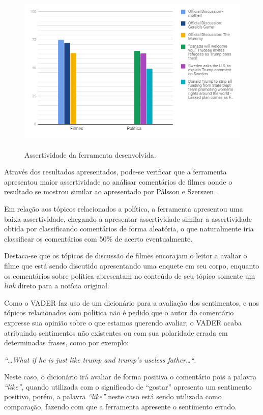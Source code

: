 \begin{figure}[!htbp]
\centering
\includegraphics[height=300px]{imagens/grafico1.png}
\caption{Assertividade da ferramenta desenvolvida.}
\label{fig:ass}
\end{figure}

Através dos resultados
apresentados, pode-se verificar que a ferramenta apresentou maior assertividade
ao análisar comentários de filmes aonde o resultado se mostrou similar ao
apresentado por Pålsson e Szerszen
\cite{SentimentinSocialMedia}. 

Em relação aos tópicos relacionados a política, a ferramenta apresentou uma
baixa assertividade, chegando a apresentar assertividade similar a assertividade
obtida por classificando comentários de forma aleatória, o que naturalmente
iria classificar os comentários com 50\% de acerto eventualmente.

\newpage

Destaca-se que os tópicos de discussão de filmes encorajam o leitor a avaliar o
filme que está sendo discutido apresentando uma enquete em seu corpo, enquanto
os comentários sobre política apresentam no conteúdo de seu tópico somente um
\textit{link} direto para a notícia original. 

Como o \ac{VADER} faz uso de um
dicionário para a avaliação dos sentimentos, e nos tópicos relacionados com
política não é pedido que o autor do comentário expresse sua opinião sobre o
que estamos querendo avaliar, o \ac{VADER} acaba atribuindo sentimentos não
existentes ou com sua polaridade errada em determinadas frases, como por
exemplo: 

\textit{``\ldots What if he is just like trump and trump's useless
father\ldots``}. 

Neste caso, o dicionário irá avaliar de forma positiva o
comentário pois a palavra \textit{``like''}, quando utilizada com o significado
de ``gostar'' apresenta um sentimento positivo, porém, a palavra
\textit{``like''} neste caso está sendo utilizada como comparação, fazendo com
que a ferramenta apresente o sentimento errado.

